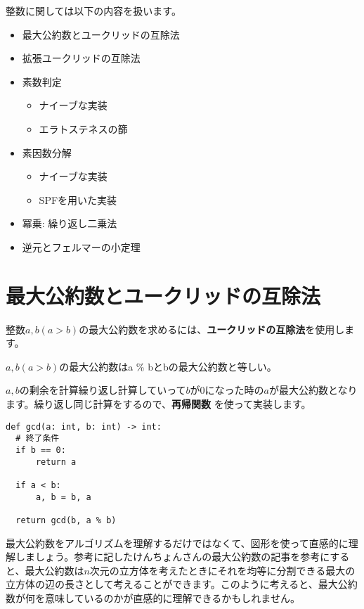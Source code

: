\documentclass{jlreq}
\begin{document}
 
整数に関しては以下の内容を扱います。

\begin{itemize}
  \item 最大公約数とユークリッドの互除法
  \item 拡張ユークリッドの互除法
  \item 素数判定
  \begin{itemize}
    \item ナイーブな実装
    \item エラトステネスの篩

  \end{itemize}
  \item 素因数分解
  \begin{itemize}
    \item ナイーブな実装
    \item SPFを用いた実装
  \end{itemize}
  \item 冪乗: 繰り返し二乗法
  \item 逆元とフェルマーの小定理
\end{itemize}

\section{最大公約数とユークリッドの互除法}

整数$a, b(a > b)$の最大公約数を求めるには、\textbf{ユークリッドの互除法}を使用します。

\begin{tcolorbox}[enhanced,title=ユークリッドの互除法, 
  attach boxed title to top left, 
  colback=white!95!blue,
  colbacktitle=white!10!blue!50!black,
  drop fuzzy shadow,
  boxrule=0.25mm,
  ]
  $a, b(a > b)$の最大公約数はa \% bとbの最大公約数と等しい。
\end{tcolorbox}

$a, b$の剰余を計算繰り返し計算していって$b$が0になった時の$a$が最大公約数となります。繰り返し同じ計算をするので、\textbf{再帰関数}
を使って実装します。

\begin{lstlisting}[caption=ユークリッドの互助法実装, frame=TRBL, label={euclid}]
def gcd(a: int, b: int) -> int:
  # 終了条件
  if b == 0:
      return a
  
  if a < b:
      a, b = b, a
      
  return gcd(b, a % b)
\end{lstlisting}

最大公約数をアルゴリズムを理解するだけではなくて、図形を使って直感的に理解しましょう。参考に記したけんちょんさんの最大公約数の記事を参考にすると、最大公約数は$n$次元の立方体を考えたときにそれを均等に分割できる最大の立方体の辺の長さとして考えることができます。このように考えると、最大公約数が何を意味しているのかが直感的に理解できるかもしれません。
\end{document}
